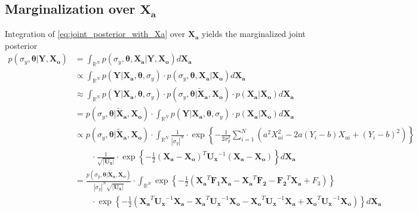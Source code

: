 \documentclass[10pt]{article}
\renewcommand{\vec}[1]{\boldsymbol{#1}}
\newcommand{\mat}[1]{\boldsymbol{#1}}
\begin{document}
\subsection{Marginalization over $\vec{X_a}$}
Integration of \cref{eq:joint_posterior_with_Xa} over $\vec{X_a}$ yields the marginalized joint posterior
{\tiny
\begin{align}
    p(\sigma_y, \vec{\theta} | \vec{Y}, \vec{X_o}) 
    
    &= \int_{\mathbb{R}^N} 
        p(\sigma_y, \vec{\theta}, \vec{X_a} | \vec{Y}, \vec{X_o})
        d\vec{X_a} \\
    
    &\propto \int_{\mathbb{R}^N}
        p(\vec{Y} | \vec{X_a}, \vec{\theta}, \sigma_y) \cdot
        p(\sigma_y, \vec{\theta}, \vec{X_a} | \vec{X_o}) 
        d\vec{X_a} \\
    
    &\approx \int_{\mathbb{R}^N}
        p(\vec{Y} | \vec{X_a}, \vec{\theta}, \sigma_y) \cdot
        p(\sigma_y, \vec{\theta} |  \vec{\tilde{X}_a}, \vec{X_o}) \cdot
        p(\vec{X_a} | \vec{X_o}) 
        d\vec{X_a} \\

    &= p(\sigma_y, \vec{\theta} |  \vec{\tilde{X}_a}, \vec{X_o}) \cdot
        \int_{\mathbb{R}^N}
        p(\vec{Y} | \vec{X_a}, \vec{\theta}, \sigma_y) \cdot
        p(\vec{X_a} | \vec{X_o}) 
        d\vec{X_a} \\
        
    &\propto p(\sigma_y, \vec{\theta} |  \vec{\tilde{X}_a}, \vec{X_o}) \cdot 
    \int_{\mathbb{R}^N} 
        \frac{1}{|\sigma_y|^N} \cdot 
        \exp\left\{- \frac{1}{2\sigma_y^2} \sum_{i=1}^N (a^2 X_{ai}^2  - 2 a (Y_i - b) X_{ai} + (Y_i - b)^2) \right\} \nonumber \\
    &   \qquad \cdot 
        \frac{1}{\sqrt{|\mat{U_x}|}} \cdot
        \exp\left\{- \frac{1}{2} (\vec{X_a} - \vec{X_o})^T \mat{U_x}^{-1} (\vec{X_a} - \vec{X_o}) \right\} 
        d\vec{X_a} \\
        
    &= \frac{p(\sigma_y, \vec{\theta} |  \vec{\tilde{X}_a}, \vec{X_o})}{|\sigma_y|^N \sqrt{|\mat{U_x}|}} \cdot 
    \int_{\mathbb{R}^N} 
        \exp\left\{- \frac{1}{2} (\vec{X_a}^T \mat{F_1} \vec{X_a} - \vec{X_a}^T \vec{F_2} - \vec{F_2}^T \vec{X_a} + F_3) \right\}\nonumber \\
    &   \qquad  \cdot 
        \exp\left\{- \frac{1}{2} (\vec{X_a}^T \mat{U_x}^{-1} \vec{X_a} - \vec{X_a}^T \mat{U_x}^{-1} \vec{X_o} - \vec{X_o}^T \mat{U_x}^{-1} \vec{X_a} + \vec{X_o}^T \mat{U_x}^{-1} \vec{X_o}) \right\} 
        d\vec{X_a} \\
        

\end{align}}
\end{document}
